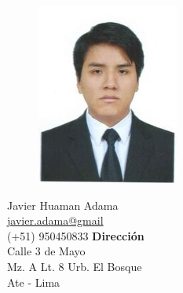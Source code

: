 \documentclass[a4paper,12pt,final]{memoir}
\newcommand{\Sep}{\vspace{1.5em}}
\begin{document}
\clearpage

\begin{figure}
	\hfill
	\includegraphics[width=0.6\columnwidth]{profile}
	\vspace{-7cm}
\end{figure}

\begin{flushright}\small
	Javier Huaman Adama \\
	\url{javier.adama@gmail}  \\
	(+51) 950450833
	\Sep
	\textbf{Dirección} \\
	Calle 3 de Mayo \\ %
	Mz. A Lt. 8 Urb. El Bosque \\ %
	Ate - Lima \\ %
\end{flushright}\normalsize
\framebreak
\end{document}

